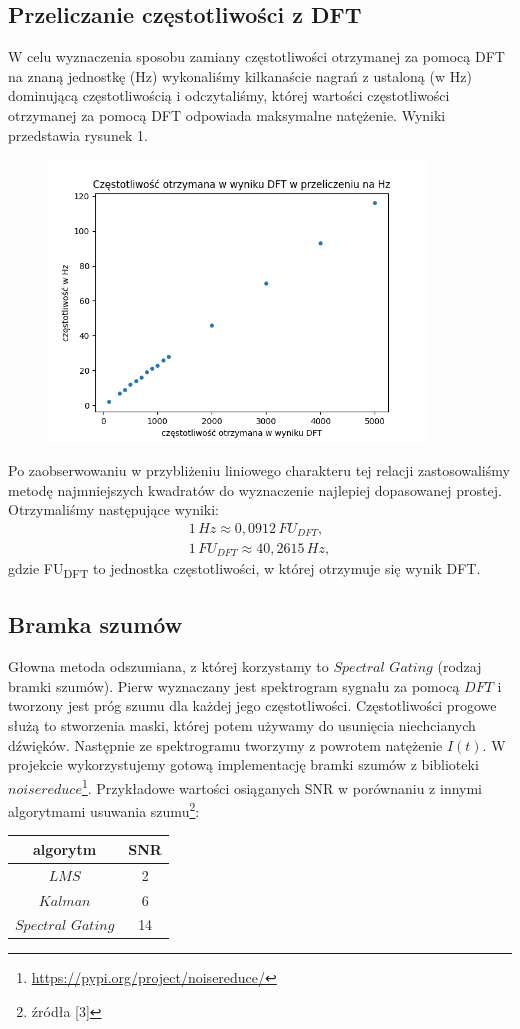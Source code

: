 \documentclass[polish]{article}
\begin{document}
\subsection{Przeliczanie częstotliwości z DFT}
W celu wyznaczenia sposobu zamiany częstotliwości otrzymanej za pomocą DFT na znaną jednostkę (Hz) wykonaliśmy kilkanaście nagrań z ustaloną (w Hz) dominującą częstotliwością i odczytaliśmy, której wartości częstotliwości otrzymanej za pomocą DFT odpowiada maksymalne natężenie. Wyniki przedstawia rysunek 1.
\begin{figure}[H]
	\centering
	\includegraphics[width=10cm]{przeliczanie_dft_hz}
	\caption{}
\end{figure}
Po zaobserwowaniu w przybliżeniu liniowego charakteru tej relacji zastosowaliśmy metodę najmniejszych kwadratów do wyznaczenie najlepiej dopasowanej prostej. Otrzymaliśmy następujące wyniki:
\begin{gather*}
	1\,\unit{Hz}\approx0,0912\,\unit{FU_{DFT}},\\
	1\,\unit{FU_{DFT}}\approx40,2615\,\unit{Hz},
\end{gather*}
gdzie \unit{FU_{DFT}} to jednostka częstotliwości, w której otrzymuje się wynik DFT.
\subsection{Bramka szumów}
Głowna metoda odszumiana, z której korzystamy to $Spectral$ $Gating$ (rodzaj bramki szumów).  Pierw wyznaczany jest spektrogram sygnału za pomocą $DFT$ i 
tworzony jest próg szumu dla każdej jego częstotliwości.
Częstotliwości progowe służą to stworzenia maski, której potem używamy do usunięcia niechcianych dźwięków.
Następnie ze spektrogramu tworzymy z powrotem natężenie $I(t)$. W projekcie wykorzystujemy gotową implementację bramki szumów z biblioteki $noisereduce$\footnote{\url{https://pypi.org/project/noisereduce/}}. Przykładowe wartości osiąganych SNR w porównaniu z innymi 
algorytmami usuwania szumu\footnote{źródła [3]}:
\begin{center}
\begin{tabular}{c  | c }
algorytm & SNR \\
\hline
$LMS$ & 2 \\
$Kalman$ & 6 \\
$Spectral$ $Gating$ & 14
\end{tabular}
\end{center}
\end{document}
